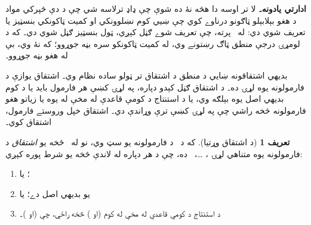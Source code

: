 \documentclass[12pt,a4paper,oneside]{report}
\newcommand{\olfileid}[3]{\gdef\pspart{#1}\gdef\pschapter{#2}\gdef\pssection{#3}}
\gdef\pspart{#2}\gdef\pschapter{#3}\gdef\pssection{}%
\theoremstyle{definition}
\newtheorem{defn}[thm]{تعريف}
\newenvironment{editorial}{\begin{framed}\textbf{ادارتي يادونه۔}\enspace}{\end{framed}}
\newenvironment{explain}{}{}
\begin{document}
\label{olpseg:OLP-0112-B004:start}
\label{olpseg:OLP-0112-B004:end}

\label{olpseg:OLP-0112-B005:start}
\begin{editorial}
  لا تر اوسه دا هڅه نۀ ده شوې چې ډاډ ترلاسه شي چې د دې څپرکي مواد
  د هغو بېلابېلو ټاګونو درناوے کوي چې ښيي کوم نښلوونکي او کميت
  ټاکونکي بنسټيز يا تعريف شوي دي: له~\LR{$\liff$} پرته، چې تعريف شوے
  ګڼل کېږي، ټول بنسټيز ګڼل شوي دي۔ که د لومړۍ درجې منطق ټاګ رښتونے
  وي، له کميت ټاکونکو سره بڼه جوړوو؛ که نۀ وي، بې له هغو بڼه جوړوو۔
\end{editorial}
\label{olpseg:OLP-0112-B005:end}

\label{olpseg:OLP-0112-B008:start}
%


\label{olpseg:OLP-0112-B008:end}

\label{olpseg:OLP-0112-B010:start}
%


\label{olpseg:OLP-0112-B010:end}

\label{olpseg:OLP-0112-B013:start}
%


\label{olpseg:OLP-0112-B013:end}

\label{olpseg:OLP-0112-B016:start}
%


\label{olpseg:OLP-0112-B016:end}

\label{olpseg:OLP-0113-B004:start}
\olfileid{fol}{axd}{rul}
\label{olpseg:OLP-0113-B004:end}

\label{olpseg:OLP-0113-B005:start}
\label{olpseg:OLP-0113-B005:end}

\label{olpseg:OLP-0113-B006:start}
\begin{explain}
  بديهي اشتقاقونه ښايي د منطق د اشتقاق تر ټولو ساده
  نظام وي۔ اشتقاق يوازې د فارمولونه يوه لړۍ ده۔ د
  اشتقاق ګڼل کېدو دپاره، په لړۍ کښې هر فارمول بايد
  يا د کوم بديهي اصل يوه بېلګه وي، يا د استنتاج د کومې قاعدې له مخې
  له يوه يا زياتو هغو فارمولونه څخه راشي چې په لړۍ کښې ترې وړاندې
  دي۔ اشتقاق خپل وروستے فارمول، اشتقاق کوي۔
\end{explain}
\label{olpseg:OLP-0113-B006:end}

\label{olpseg:OLP-0113-B007:start}
\begin{defn}[د اشتقاق وړتيا]
که \LR{$\Gamma$} د~ د فارمولونه يو سټ وي، نو له~\LR{$\Gamma$}
څخه يو \emph{اشتقاق} د فارمولونه يوه متناهي لړۍ
، \dots،~ ده، چې د هر  دپاره له لاندې څخه
يو شرط پوره کېږي:
\begin{enumerate}
\item {}؛ يا
\item {} يو بديهي اصل دے؛ يا
\item {} د استنتاج د کومې قاعدې له مخې له کوم  (او
  ) څخه راځي، چې  (او )۔
\end{enumerate}
\end{defn}
\label{olpseg:OLP-0113-B007:end}
\end{document}

